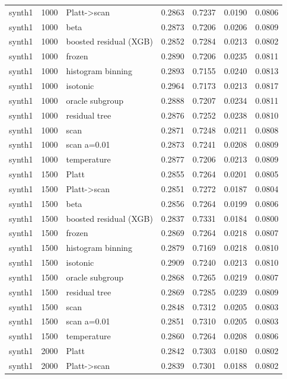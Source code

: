 \begin{tabular}{lllrrrr}
synth1 & 1000 & Platt->scan & 0.2863 & 0.7237 & 0.0190 & 0.0806 \\
synth1 & 1000 & beta & 0.2873 & 0.7206 & 0.0206 & 0.0809 \\
synth1 & 1000 & boosted residual (XGB) & 0.2852 & 0.7284 & 0.0213 & 0.0802 \\
synth1 & 1000 & frozen & 0.2890 & 0.7206 & 0.0235 & 0.0811 \\
synth1 & 1000 & histogram binning & 0.2893 & 0.7155 & 0.0240 & 0.0813 \\
synth1 & 1000 & isotonic & 0.2964 & 0.7173 & 0.0213 & 0.0817 \\
synth1 & 1000 & oracle subgroup & 0.2888 & 0.7207 & 0.0234 & 0.0811 \\
synth1 & 1000 & residual tree & 0.2876 & 0.7252 & 0.0238 & 0.0810 \\
synth1 & 1000 & scan & 0.2871 & 0.7248 & 0.0211 & 0.0808 \\
synth1 & 1000 & scan a=0.01 & 0.2873 & 0.7241 & 0.0208 & 0.0809 \\
synth1 & 1000 & temperature & 0.2877 & 0.7206 & 0.0213 & 0.0809 \\
synth1 & 1500 & Platt & 0.2855 & 0.7264 & 0.0201 & 0.0805 \\
synth1 & 1500 & Platt->scan & 0.2851 & 0.7272 & 0.0187 & 0.0804 \\
synth1 & 1500 & beta & 0.2856 & 0.7264 & 0.0199 & 0.0806 \\
synth1 & 1500 & boosted residual (XGB) & 0.2837 & 0.7331 & 0.0184 & 0.0800 \\
synth1 & 1500 & frozen & 0.2869 & 0.7264 & 0.0218 & 0.0807 \\
synth1 & 1500 & histogram binning & 0.2879 & 0.7169 & 0.0218 & 0.0810 \\
synth1 & 1500 & isotonic & 0.2909 & 0.7240 & 0.0213 & 0.0810 \\
synth1 & 1500 & oracle subgroup & 0.2868 & 0.7265 & 0.0219 & 0.0807 \\
synth1 & 1500 & residual tree & 0.2869 & 0.7285 & 0.0239 & 0.0809 \\
synth1 & 1500 & scan & 0.2848 & 0.7312 & 0.0205 & 0.0803 \\
synth1 & 1500 & scan a=0.01 & 0.2851 & 0.7310 & 0.0205 & 0.0803 \\
synth1 & 1500 & temperature & 0.2860 & 0.7264 & 0.0208 & 0.0806 \\
synth1 & 2000 & Platt & 0.2842 & 0.7303 & 0.0180 & 0.0802 \\
synth1 & 2000 & Platt->scan & 0.2839 & 0.7301 & 0.0188 & 0.0802 \\

\end{tabular}
